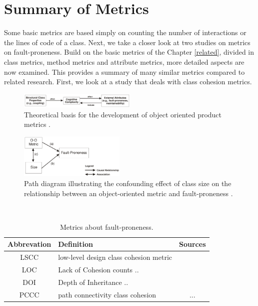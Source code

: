 \section{Summary of Metrics}\label{analysis}

Some basic metrics are based simply on counting the number of interactions or the lines of code of a class. Next, we take a closer look at two studies on metrics on fault-proneness. Build on the basic metrics of the Chapter \ref{related}, divided in class metrics, method metrics and attribute metrics, more detailed aspects are now examined. This provides a summary of many similar metrics compared to related research. First, we look at a study that deals with class cohesion metrics.

\begin{figure}[htbp]
	\centerline{\includegraphics[width=0.5\textwidth]{pictures/faultyclasses1.png}}
	\caption{Theoretical basis for the development of object oriented product metrics \cite{b7radjenovic2013software}.}
	\label{figCoupling}
\end{figure}

\begin{figure}[htbp]
	\centerline{\includegraphics[width=0.45\textwidth]{pictures/faultyclasses2.png}}
	\caption{Path diagram illustrating the confounding effect of class size on the relationship between an object-oriented metric and fault-proneness \cite{b7radjenovic2013software}.}
	\label{figSize}
\end{figure}


\begin{table}
	\caption{Metrics about fault-proneness.}~\label{tab:metrics}
	
	\setlength\tabcolsep{3pt}
	\renewcommand{\arraystretch}{1.4}%
	\begin{tabularx}{\columnwidth}{ | c | p{5.8cm} || c | }
		\hline
		Abbrevation & Definition & Sources \\ \hline\hline
		LSCC & low-level design class cohesion metric & \cite{b3al2012fault} \\ \hline
		LOC & Lack of Cohesion counts ..  & \cite{b15chidamber1991towards} \\ \hline
		DOI & Depth of Inheritance .. & \cite{b15chidamber1991towards} \\ \hline
		PCCC & path connectivity class cohesion & ... \\ \hline
	\end{tabularx}
\end{table}



